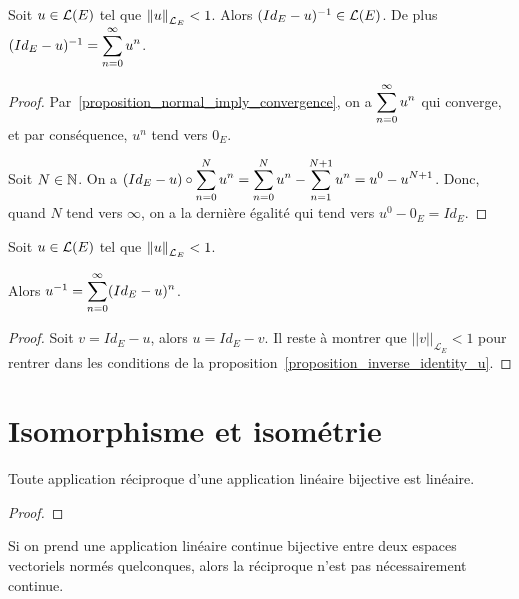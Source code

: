 \newcommand{\inverseU}[1]{$\GSsum{n}{0}{\infty}{(Id_{E} - #1)^{n}}$}

\begin{proposition}
	\label{proposition_inverse_identity_u}
	Soit $u \in \mathcal{L}(E)$ tel que $\norm{u}_{\mathcal{L}_{E}} < 1$. Alors
	$(Id_{E} - u)^{-1} \in \mathcal{L}(E)$. De plus $(Id_{E} - u)^{-1} =
	\displaystyle \sum_{n = 0}^{\infty} u^{n}$.
\end{proposition}


\ifdefined\outputproof
\begin{proof}
	Par~\ref{proposition_normal_imply_convergence}, on a
	$\displaystyle \sum_{n = 0}^{\infty} u^{n}$ qui converge, et par conséquence, $u^{n}$ tend
	vers $0_{E}$.

	Soit $N \in \mathbb{N}$. On a $(Id_{E} - u) \circ \displaystyle \sum_{n = 0}^{N} u^{n} =
	\displaystyle \sum_{n = 0}^{N} u^{n} - \displaystyle \sum_{n = 1}^{N + 1} u^{n} = u^{0} - u^{N
	+ 1}$. Donc, quand $N$ tend vers $\infty$, on a la dernière égalité qui tend
	vers $u^{0} - 0_{E} = Id_{E}$.
\end{proof}
\fi

\begin{corollary}
	Soit $u \in \mathcal{L}(E)$ tel que $\norm{u}_{\mathcal{L}_{E}} < 1$.

	Alors $u^{-1} = \displaystyle \sum_{n = 0}^{\infty} (Id_{E} - u)^{n}$.
\end{corollary}

\ifdefined\outputproof
\begin{proof}
	Soit $v = Id_{E} - u$, alors $u = Id_{E} - v$. Il reste à montrer que
	$||v||_{\mathcal{L}_{E}} < 1$ pour rentrer dans les conditions de la
	proposition~\ref{proposition_inverse_identity_u}.
\end{proof}
\fi


\section{Isomorphisme et isométrie}

\begin{proposition}
	Toute application réciproque d'une application linéaire bijective est
	linéaire.
\end{proposition}

\ifdefined\outputproof
\begin{proof}

\end{proof}
\fi

Si on prend une application linéaire continue bijective entre deux espaces
vectoriels normés quelconques, alors la réciproque n'est pas nécessairement
continue.

